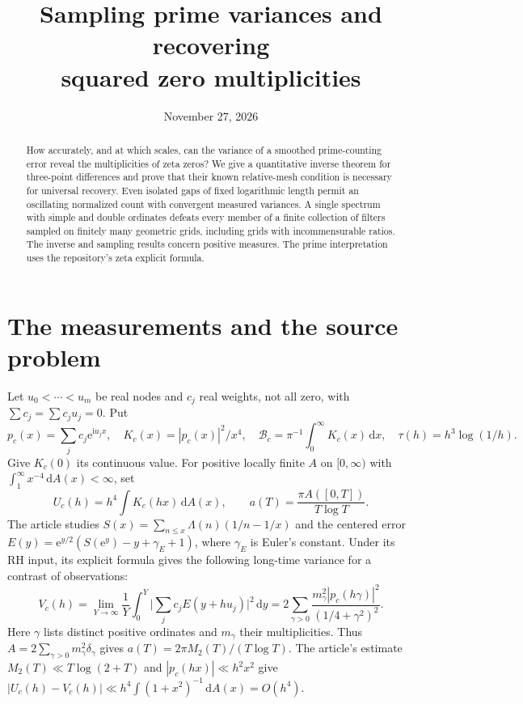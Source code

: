 \documentclass[11pt,letterpaper]{article}
\title{Sampling prime variances and recovering\\squared zero multiplicities}
\author{}
\date{November 27, 2026}
\theoremstyle{definition}
\newcommand{\dd}{\,\mathrm d}
\newcommand{\ii}{\mathrm i}
\newcommand{\ee}{\mathrm e}
\newcommand{\BB}{\mathcal B}
\begin{document}
\maketitle
\begin{abstract}
How accurately, and at which scales, can the variance of a smoothed prime-counting error reveal the multiplicities of zeta zeros? We give a quantitative inverse theorem for three-point differences and prove that their known relative-mesh condition is necessary for universal recovery. Even isolated gaps of fixed logarithmic length permit an oscillating normalized count with convergent measured variances. A single spectrum with simple and double ordinates defeats every member of a finite collection of filters sampled on finitely many geometric grids, including grids with incommensurable ratios. The inverse and sampling results concern positive measures. The prime interpretation uses the repository's zeta explicit formula.
\end{abstract}
\section{The measurements and the source problem}
Let $u_0<\cdots<u_m$ be real nodes and $c_j$ real weights, not all zero, with
$\sum c_j=\sum c_ju_j=0$. Put
\[
 p_c(x)=\sum_jc_j\ee^{\ii u_jx},\quad K_c(x)=|p_c(x)|^2/x^4,\quad
 \BB_c=\pi^{-1}\int_0^\infty K_c(x)\dd x,\quad \tau(h)=h^3\log(1/h).
\]
Give $K_c(0)$ its continuous value. For positive locally finite $A$ on $[0,\infty)$ with $\int_1^\infty x^{-4}\dd A(x)<\infty$, set
\[
 U_c(h)=h^4\int K_c(hx)\dd A(x),\qquad a(T)=\frac{\pi A([0,T])}{T\log T}.
\]
The article \cite{article} studies $S(x)=\sum_{n\le x}\Lambda(n)(1/n-1/x)$ and the centered error $E(y)=\ee^{y/2}(S(\ee^y)-y+\gamma_E+1)$, where $\gamma_E$ is Euler's constant. Under its RH input, its explicit formula gives the following long-time variance for a contrast of observations:
\[
 V_c(h)=\lim_{Y\to\infty}\frac1Y\int_0^Y\Big|\sum_jc_jE(y+hu_j)\Big|^2\dd y
 =2\sum_{\gamma>0}\frac{m_\gamma^2|p_c(h\gamma)|^2}{(1/4+\gamma^2)^2}.
\]
Here $\gamma$ lists distinct positive ordinates and $m_\gamma$ their multiplicities. Thus $A=2\sum_{\gamma>0}m_\gamma^2\delta_\gamma$ gives $a(T)=2\pi M_2(T)/(T\log T)$. The article's estimate $M_2(T)\ll T\log(2+T)$ and $|p_c(hx)|\ll h^2x^2$ give $|U_c(h)-V_c(h)|\ll h^4\int(1+x^2)^{-1}\dd A(x)=O(h^4)$.
\end{document}
